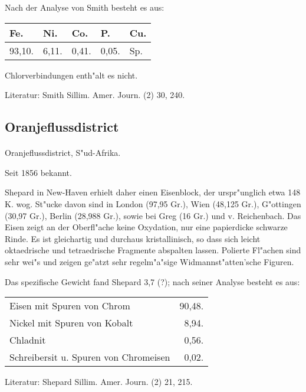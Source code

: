 \documentclass[a4paper, 11pt, oneside]{article}
\begin{document}
Nach der Analyse von Smith besteht es aus:
\begin{table}[H]
    \centering
    \begin{tabular}{l l l l l}
        Fe. & Ni. & Co. & P. & Cu. \\ \hline
        93,10. & 6,11. & 0,41. & 0,05. & Sp. \\
    \end{tabular}
\end{table}

Chlorverbindungen enth"alt es nicht.

\footnotesize
Literatur: Smith Sillim. Amer. Journ. (2) 30, 240.

\subsection{Oranjeflussdistrict}
\normalsize
\paragraph{}
Oranjeflussdistrict, S"ud-Afrika.

Seit 1856 bekannt.

Shepard in New-Haven erhielt daher einen Eisenblock, der urspr"unglich etwa 148 K. wog. St"ucke davon sind in London (97,95 Gr.), Wien (48,125 Gr.), G"ottingen (30,97 Gr.), Berlin (28,988 Gr.), sowie bei Greg (16 Gr.) und v. Reichenbach. Das Eisen zeigt an der Oberfl"ache keine Oxydation, nur eine papierdicke schwarze Rinde. Es ist gleichartig und durchaus kristallinisch, so dass sich leicht oktaedrische und tetraedrische Fragmente abspalten lassen. Polierte Fl"achen sind sehr wei"s und zeigen ge"atzt sehr regelm"a"sige Widmannst"atten'sche Figuren.

Das spezifische Gewicht fand Shepard 3,7 (?); nach seiner Analyse besteht es aus:
\begin{table}[H]
    \centering
    \begin{tabular}{l r}
        Eisen mit Spuren von Chrom & 90,48. \\
        Nickel mit Spuren von Kobalt & 8,94. \\
        Chladnit & 0,56. \\
        Schreibersit u. Spuren von Chromeisen & 0,02. \\
    \end{tabular}
\end{table}

\footnotesize
Literatur: Shepard Sillim. Amer. Journ. (2) 21, 215.
\end{document}
